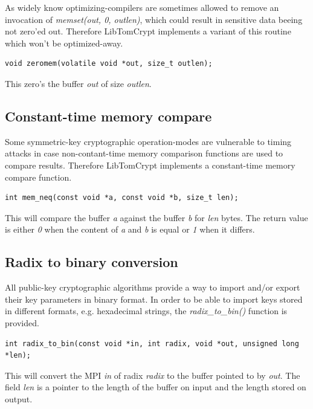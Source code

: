 \documentclass[synpaper]{book}
\begin{document}
As widely know optimizing-compilers are sometimes allowed to remove an invocation of \textit{memset(out, 0, outlen)}, which could result
in sensitive data beeing not zero'ed out. Therefore LibTomCrypt implements a variant of this routine which won't be optimized-away.

\begin{verbatim}
void zeromem(volatile void *out, size_t outlen);
\end{verbatim}

This zero's the buffer \textit{out} of size \textit{outlen}.

\subsection{Constant-time memory compare}

Some symmetric-key cryptographic operation-modes are vulnerable to timing attacks in case non-contant-time memory comparison functions
are used to compare results. Therefore LibTomCrypt implements a constant-time memory compare function.

\begin{verbatim}
int mem_neq(const void *a, const void *b, size_t len);
\end{verbatim}

This will compare the buffer \textit{a} against the buffer \textit{b} for \textit{len} bytes.
The return value is either \textit{0} when the content of \textit{a} and \textit{b} is equal or \textit{1} when it differs.

\subsection{Radix to binary conversion}

All public-key cryptographic algorithms provide a way to import and/or export their key parameters in binary format.
In order to be able to import keys stored in different formats, e.g. hexadecimal strings, the \textit{radix\_to\_bin()} function is provided.

\begin{verbatim}
int radix_to_bin(const void *in, int radix, void *out, unsigned long *len);
\end{verbatim}

This will convert the MPI \textit{in} of radix \textit{radix} to the buffer pointed to by \textit{out}.
The field \textit{len} is a pointer to the length of the buffer on input and the length stored on output.
\end{document}
